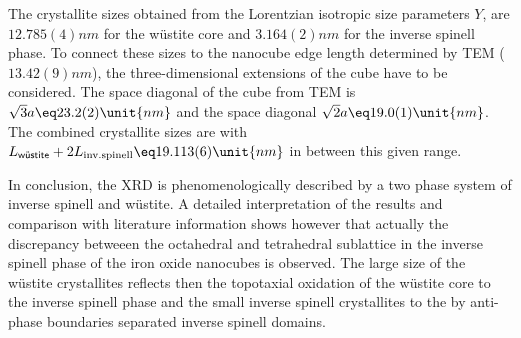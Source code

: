 \documentclass[\main/dresen_thesis.tex]{subfiles}
\begin{document}
  The crystallite sizes obtained from the Lorentzian isotropic size parameters $Y$, are $12.785(4) \unit{nm}$ for the w\"ustite core and $3.164(2) \unit{nm}$ for the inverse spinell phase.
  To connect these sizes to the nanocube edge length determined by TEM ($13.42(9) \unit{nm}$), the three-dimensional extensions of the cube have to be considered.
  The space diagonal of the cube from TEM is $\sqrt{3} a \eq 23.2(2) \unit{nm}$ and the space diagonal $\sqrt{2} a \eq 19.0(1) \unit{nm}$.
  The combined crystallite sizes are with $L_\textsf{w\"ustite} + 2 L_\mathrm{inv. spinell} \eq 19.113(6) \unit{nm}$ in between this given range.

  In conclusion, the XRD is phenomenologically described by a two phase system of inverse spinell and w\"ustite.
  A detailed interpretation of the results and comparison with literature information shows however that actually the discrepancy betweeen the octahedral and tetrahedral sublattice in the inverse spinell phase of the iron oxide nanocubes is observed.
  The large size of the w\"ustite crystallites reflects then the topotaxial oxidation of the w\"ustite core to the inverse spinell phase and the small inverse spinell crystallites to the by anti-phase boundaries separated inverse spinell domains.
\end{document}
